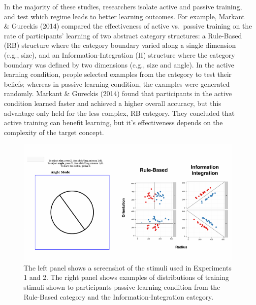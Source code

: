 \documentclass[10pt, letterpaper]{article}
\newenvironment{CodeChunk}{}{}
\begin{document}
In the majority of these studies, researchers isolate active and passive
training, and test which regime leads to better learning outcomes. For
example, Markant \& Gureckis (2014) compared the effectiveness of active
vs.~passive training on the rate of participants' learning of two
abstract category structures: a Rule-Based (RB) structure where the
category boundary varied along a single dimension (e.g., size), and an
Information-Integration (II) structure where the category boundary was
defined by two dimensions (e.g., size and angle). In the active learning
condition, people selected examples from the category to test their
beliefs; whereas in passive learning condition, the examples were
generated randomly. Markant \& Gureckis (2014) found that participants
in the active condition learned faster and achieved a higher overall
accuracy, but this advantage only held for the less complex, RB
category. They concluded that active training can benefit learning, but
it's effectiveness depends on the complexity of the target concept.

\begin{CodeChunk}
\captionsetup{width=0.8\textwidth}\begin{figure}[t]

{\centering \includegraphics{figs/stimuli_exp1-1} 

}

\caption[The left panel shows a screenshot of the stimuli used in Experiments 1 and 2]{The left panel shows a screenshot of the stimuli used in Experiments 1 and 2. The right panel shows examples of distributions of training stimuli shown to participants passive learning condition from the Rule-Based category and the Information-Integration category.}\label{fig:stimuli_exp1}
\end{figure}
\end{CodeChunk}
\end{document}
